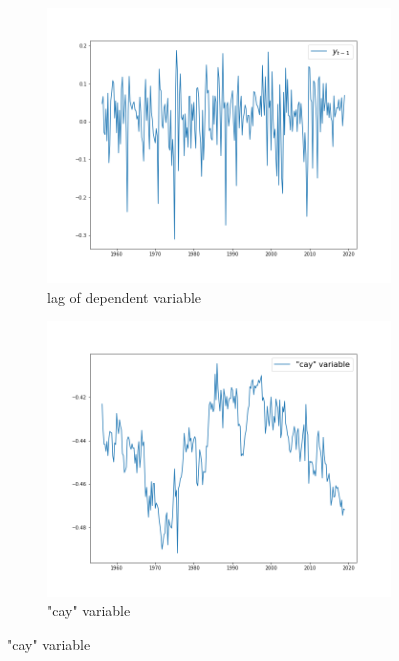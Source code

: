 \documentclass[a4paper,12pt,times,numbered,print,index]{report}
\numberwithin{equation}{section}
\begin{document}
\begin{figure}[!htbp]
	\centering
	\caption{Time Series Plots of Stationary Variables}
	\begin{subfigure}[b]{0.48\linewidth}
		\includegraphics[width = \linewidth]{plots/ylag.png}
		\caption{lag of dependent variable}
	\end{subfigure}
	\begin{subfigure}[b]{0.48\linewidth}
		\includegraphics[width = \linewidth]{plots/new_cay.png}
		\caption{"cay" variable}
	\end{subfigure}
	\label{station_vs}
\end{figure}
\end{document}

